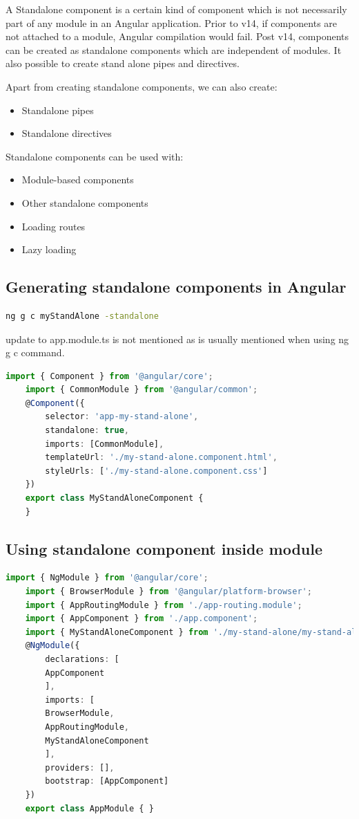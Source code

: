 \documentclass{report}
\begin{document}
A Standalone component is a certain kind of component which is not necessarily part of any module in an Angular application. Prior to v14, if components are not attached to a module, Angular compilation would fail. Post v14, components can be created as standalone components which are independent of modules. It also possible to create stand alone pipes and directives.

Apart from creating standalone components, we can also create:
\begin{itemize}
	\item{Standalone pipes }
	\item{Standalone directives}
\end{itemize}


Standalone components can be used with:
\begin{itemize}
	\item{Module-based components}
	\item{Other standalone components}
	\item{Loading routes}
	\item{Lazy loading}
\end{itemize}

\subsection{Generating standalone components in Angular}
\begin{lstlisting}[language=bash]
	ng g c myStandAlone -standalone
\end{lstlisting}

update to app.module.ts is not mentioned as is usually mentioned when using ng g c command.
\begin{lstlisting}[caption=my-stand-alone.component.ts, language=Typescript]
	import { Component } from '@angular/core';
	import { CommonModule } from '@angular/common';
	@Component({
		selector: 'app-my-stand-alone',
		standalone: true,
		imports: [CommonModule],
		templateUrl: './my-stand-alone.component.html',
		styleUrls: ['./my-stand-alone.component.css']
	})
	export class MyStandAloneComponent {
	}
\end{lstlisting}
\subsection{Using standalone component inside module}

\begin{lstlisting}[caption=app.module.ts, language=Typescript]
	import { NgModule } from '@angular/core';
	import { BrowserModule } from '@angular/platform-browser';
	import { AppRoutingModule } from './app-routing.module';
	import { AppComponent } from './app.component';
	import { MyStandAloneComponent } from './my-stand-alone/my-stand-alone.component';
	@NgModule({
		declarations: [
		AppComponent
		],
		imports: [
		BrowserModule,
		AppRoutingModule,
		MyStandAloneComponent
		],
		providers: [],
		bootstrap: [AppComponent]
	})
	export class AppModule { }
\end{lstlisting}
\end{document}
